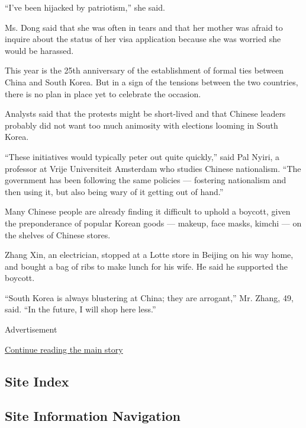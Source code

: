 ``I've been hijacked by patriotism,'' she said.

Ms. Dong said that she was often in tears and that her mother was afraid
to inquire about the status of her visa application because she was
worried she would be harassed.

\begin{quote}
\end{quote}

This year is the 25th anniversary of the establishment of formal ties
between China and South Korea. But in a sign of the tensions between the
two countries, there is no plan in place yet to celebrate the occasion.

Analysts said that the protests might be short-lived and that Chinese
leaders probably did not want too much animosity with elections looming
in South Korea.

``These initiatives would typically peter out quite quickly,'' said Pal
Nyiri, a professor at Vrije Universiteit Amsterdam who studies Chinese
nationalism. ``The government has been following the same policies ---
fostering nationalism and then using it, but also being wary of it
getting out of hand.''

Many Chinese people are already finding it difficult to uphold a
boycott, given the preponderance of popular Korean goods --- makeup,
face masks, kimchi --- on the shelves of Chinese stores.

Zhang Xin, an electrician, stopped at a Lotte store in Beijing on his
way home, and bought a bag of ribs to make lunch for his wife. He said
he supported the boycott.

``South Korea is always blustering at China; they are arrogant,'' Mr.
Zhang, 49, said. ``In the future, I will shop here less.''

Advertisement

\protect\hyperlink{after-bottom}{Continue reading the main story}

\hypertarget{site-index}{%
\subsection{Site Index}\label{site-index}}

\hypertarget{site-information-navigation}{%
\subsection{Site Information
Navigation}\label{site-information-navigation}}

